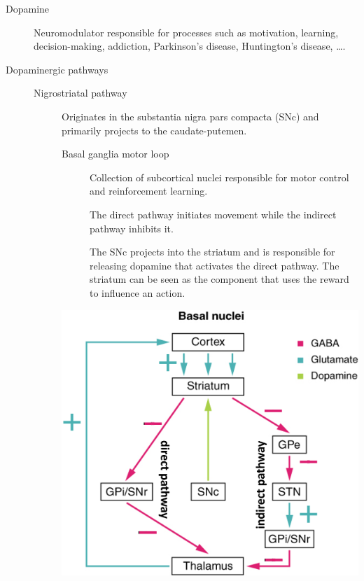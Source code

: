 \begin{description}
    \item[Dopamine] 
        Neuromodulator responsible for processes such as motivation, learning, decision-making, addiction, Parkinson's disease, Huntington's disease, \dots.

    \item[Dopaminergic pathways] 
        \begin{description}
            \item[Nigrostriatal pathway] 
                Originates in the substantia nigra pars compacta (SNc)
                and primarily projects to the caudate-putemen.
                
                \begin{minipage}{0.6\linewidth}
                    \begin{description}
                        \item[Basal ganglia motor loop]
                            Collection of subcortical nuclei responsible for motor control and reinforcement learning.
                            
                            The direct pathway initiates movement while the indirect pathway inhibits it.

                            The SNc projects into the striatum and is responsible for releasing dopamine that activates the direct pathway.
                            The striatum can be seen as the component that uses the reward to influence an action.
                    \end{description}
                \end{minipage}
                \begin{minipage}{0.35\linewidth}
                    \centering
                    \includegraphics[width=\linewidth]{./img/basal_ganglia_motor.png}
                \end{minipage}


\end{description}
\end{description}
